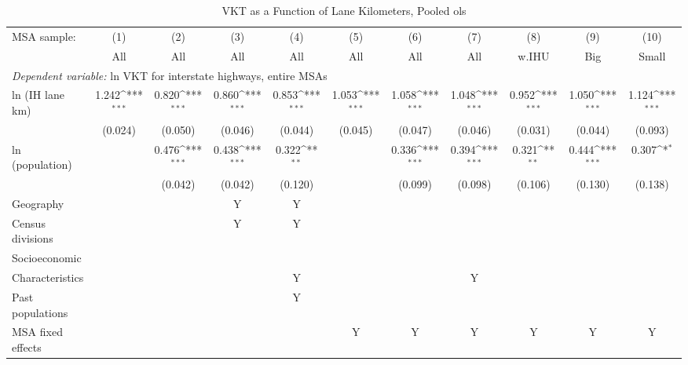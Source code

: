 \begin{table}[htbp]\centering
\def\sym#1{\ifmmode^{#1}\else\(^{#1}\)\fi}
\caption{VKT
as
a
Function
of
Lane
Kilometers,
Pooled
ols}
\begin{tabular}{l*{10}{c}}
\hline\hline
MSA sample:
                    &\multicolumn{1}{c}{(1)}&\multicolumn{1}{c}{(2)}&\multicolumn{1}{c}{(3)}&\multicolumn{1}{c}{(4)}&\multicolumn{1}{c}{(5)}&\multicolumn{1}{c}{(6)}&\multicolumn{1}{c}{(7)}&\multicolumn{1}{c}{(8)}&\multicolumn{1}{c}{(9)}&\multicolumn{1}{c}{(10)}\\
                    &\multicolumn{1}{c}{All}&\multicolumn{1}{c}{All}&\multicolumn{1}{c}{All}&\multicolumn{1}{c}{All}&\multicolumn{1}{c}{All}&\multicolumn{1}{c}{All}&\multicolumn{1}{c}{All}&\multicolumn{1}{c}{w.IHU}&\multicolumn{1}{c}{Big}&\multicolumn{1}{c}{Small}\\
 \hline \multicolumn{10}{l}{ \emph{Dependent variable:} ln VKT for interstate highways, entire MSAs} \\ 
ln (IH lane km)     &       1.242\sym{***}&       0.820\sym{***}&       0.860\sym{***}&       0.853\sym{***}&       1.053\sym{***}&       1.058\sym{***}&       1.048\sym{***}&       0.952\sym{***}&       1.050\sym{***}&       1.124\sym{***}\\
                    &     (0.024)         &     (0.050)         &     (0.046)         &     (0.044)         &     (0.045)         &     (0.047)         &     (0.046)         &     (0.031)         &     (0.044)         &     (0.093)         \\
[1em]
ln (population)     &                     &       0.476\sym{***}&       0.438\sym{***}&       0.322\sym{**} &                     &       0.336\sym{***}&       0.394\sym{***}&       0.321\sym{**} &       0.444\sym{***}&       0.307\sym{*}  \\
                    &                     &     (0.042)         &     (0.042)         &     (0.120)         &                     &     (0.099)         &     (0.098)         &     (0.106)         &     (0.130)         &     (0.138)         \\
           Geography & & & Y & Y & &  & & & & \\            Census divisions & & & Y & Y & &  & & & & \\           Socioeconomic           \\Characteristics & & & & Y & &  & Y & & & \\            Past populations & & & & Y & &  &  & & & \\           MSA fixed effects & & & & & Y & Y & Y & Y & Y & Y \\                 

\end{tabular}
\end{table}
